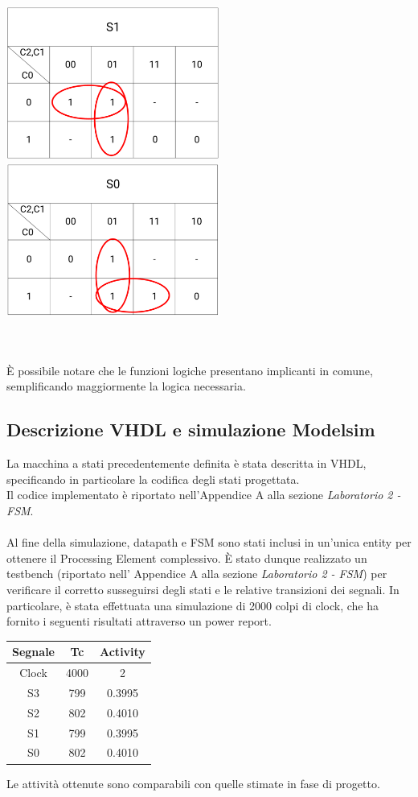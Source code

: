 \documentclass[11pt,  english, makeidx, a4paper, titlepage, oneside]{book}
\begin{document}
\\\\
\centerline{\includegraphics[width=7cm]{./img/Lab_2/K_S1.png}
			\includegraphics[width=7cm]{./img/Lab_2/K_S0.png}}
\\\\
È possibile notare che le funzioni logiche presentano implicanti in comune, semplificando maggiormente la logica necessaria.
\\
\subsection{Descrizione VHDL e simulazione Modelsim}
La macchina a stati precedentemente definita è stata descritta in VHDL, specificando in particolare la codifica degli stati progettata.
\\
Il codice implementato è riportato nell'Appendice A alla sezione \textit{Laboratorio 2 - FSM}.
\\\\
Al fine della simulazione, datapath e FSM sono stati inclusi in un'unica entity per ottenere il Processing Element complessivo. È stato dunque realizzato un testbench (riportato nell' Appendice A alla sezione \textit{Laboratorio 2 - FSM}) per verificare il corretto susseguirsi degli stati e le relative transizioni dei segnali.
In particolare, è stata effettuata una simulazione di 2000 colpi di clock, che ha fornito i seguenti risultati attraverso un power report.
\\
\begin{center}
	\begin{tabular}{|c|c|c|}
	\hline
	Segnale & Tc & Activity \\ 
	\hline
	Clock & 4000 & 2 \\
	\hline
	S3 & 799 & 0.3995 \\
	\hline
	S2 & 802 & 0.4010 \\
	\hline
	S1 & 799 & 0.3995 \\
	\hline
	S0 & 802 & 0.4010 \\
	\hline
	\end{tabular}	
\end{center}
\vspace{0.3cm}  
Le attività ottenute sono comparabili con quelle stimate in fase di progetto.  
\newpage
\end{document}
